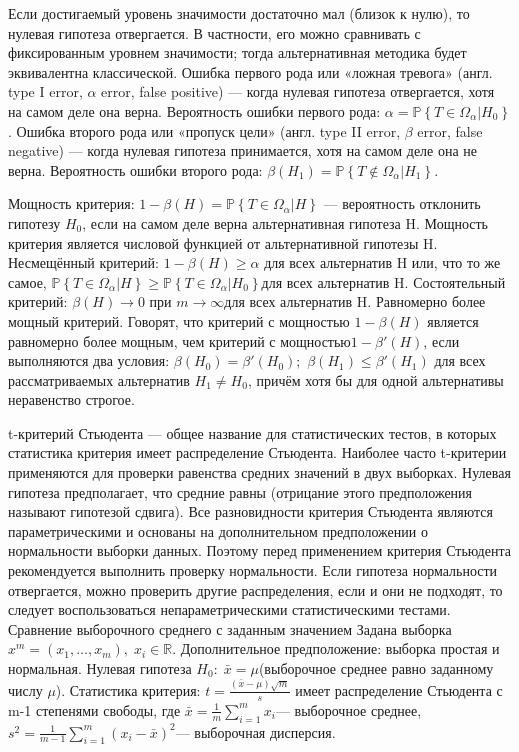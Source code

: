 \documentclass[a4paper, 12pt]{article}
\begin{document}
	Если достигаемый уровень значимости достаточно мал (близок к нулю), то нулевая гипотеза отвергается. В частности, его можно сравнивать с фиксированным уровнем значимости; тогда альтернативная методика будет эквивалентна классической.
	Ошибка первого рода или «ложная тревога» (англ. type I error, $\alpha$ error, false positive) — когда нулевая гипотеза отвергается, хотя на самом деле она верна. Вероятность ошибки первого рода:
	$\alpha = \mathbb{P}\left\{ T\in\Omega_\alpha | H_0 \right\}$.
	Ошибка второго рода или «пропуск цели» (англ. type II error, $\beta$ error, false negative) — когда нулевая гипотеза принимается, хотя на самом деле она не верна. Вероятность ошибки второго рода:
	$\beta(H_1) = \mathbb{P}\left\{ T\notin\Omega_\alpha | H_1 \right\}$.
	
	
	Мощность критерия: $1 - \beta(H) = \mathbb{P}\left\{ T\in\Omega_\alpha | H \right\}$ — вероятность отклонить гипотезу $H_0$, если на самом деле верна альтернативная гипотеза H. Мощность критерия является числовой функцией от альтернативной гипотезы H.
	Несмещённый критерий:  $1-\beta(H) \geq \alpha$ для всех альтернатив H или, что то же самое,  $\mathbb{P}\left\{ T\in\Omega_\alpha | H \right\} \geq \mathbb{P}\left\{ T\in\Omega_\alpha | H_0 \right\} $для всех альтернатив H.
	Состоятельный критерий: $ \beta(H) \to 0$ при $m\to\infty $для всех альтернатив H.
	Равномерно более мощный критерий. Говорят, что критерий с мощностью $1-\beta(H)$ является равномерно более мощным, чем критерий с мощностью$ 1-\beta'(H)$, если выполняются два условия:
	$\beta(H_0) = \beta'(H_0);$
	$\beta(H_1) \leq \beta'(H_1)$ для всех рассматриваемых альтернатив $H_1\neq H_0$, причём хотя бы для одной альтернативы неравенство строгое.
	
	t-критерий Стьюдента — общее название для статистических тестов, в которых статистика критерия имеет распределение Стьюдента. Наиболее часто t-критерии применяются для проверки равенства средних значений в двух выборках. Нулевая гипотеза предполагает, что средние равны (отрицание этого предположения называют гипотезой сдвига).
	Все разновидности критерия Стьюдента являются параметрическими и основаны на дополнительном предположении о нормальности выборки данных. Поэтому перед применением критерия Стьюдента рекомендуется выполнить проверку нормальности. Если гипотеза нормальности отвергается, можно проверить другие распределения, если и они не подходят, то следует воспользоваться непараметрическими статистическими тестами.
	Сравнение выборочного среднего с заданным значением
	Задана выборка $x^m = (x_1,\ldots,x_m),\; x_i \in \mathbb{R}$.
	Дополнительное предположение: выборка простая и нормальная.
	Нулевая гипотеза $H_0:\; \bar x = \mu $(выборочное среднее равно заданному числу $\mu$).
	Статистика критерия:
	$t = \frac{(\bar x - \mu)\sqrt{m}}{s}$
	имеет распределение Стьюдента с  m-1 степенями свободы, где
	$ \bar x = \frac1m \sum_{i=1}^m x_i $— выборочное среднее,
	$ s^2  = \frac1{m-1} \sum_{i=1}^m \left( x_i - \bar x \right)^2 $— выборочная дисперсия.
	
\end{document}
